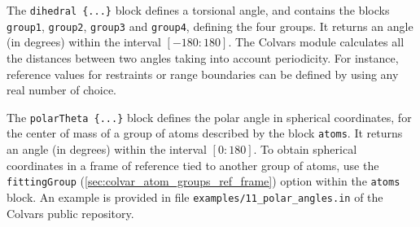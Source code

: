 \begin{cvcoptions}
\item %
\item %
\item %
\item %
\end{cvcoptions}



The \texttt{dihedral~\{...\}} block defines a torsional angle, and
contains the blocks \texttt{group1}, \texttt{group2}, \texttt{group3}
and \texttt{group4}, defining the four groups.  It returns an angle
(in degrees) within the interval $[-180:180]$.  The Colvars module
calculates all the distances between two angles taking into account
periodicity.  For instance, reference values for restraints or range
boundaries can be defined by using any real number of choice.

\begin{cvcoptions}
\item %
\item %
\item %
\item %
\item %
\end{cvcoptions}



The \texttt{polarTheta~\{...\}} block defines the polar angle in
spherical coordinates, for the center of mass of a group of atoms
described by the block \texttt{atoms}.  It returns an angle
(in degrees) within the interval $[0:180]$.
To obtain spherical coordinates in a frame of reference tied to
another group of atoms, use the \texttt{fittingGroup} (\ref{sec:colvar_atom_groups_ref_frame}) option
within the \texttt{atoms} block.
An example is provided in file \texttt{examples/11\_polar\_angles.in} of the Colvars public repository.

